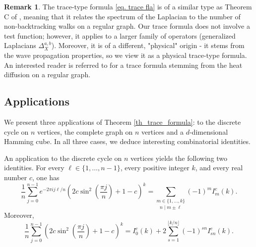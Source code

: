 \documentclass[reqno,10pt]{amsart}
\theoremstyle{definition}
\newtheorem{remark}[theorem]{Remark}
\numberwithin{equation}{section}
\begin{document}


\begin{remark}
 The trace-type formula \eqref{eq. trace fla} is of a similar type as Theorem C of \cite{GLL26}, meaning that it relates the spectrum of the Laplacian to the number of non-backtracking walks on a regular graph. Our trace formula does not involve a test function; however, it applies to a larger family of operators (generalized Laplacians $\Delta_X^{a,b}$). Moreover, it is of a different, "physical" origin - it stems from the wave propagation properties, so we view it as a physical trace-type formula. An interested reader is referred to \cite{CHJSV} for a trace formula stemming from the heat diffusion on a regular graph.   
\end{remark}

\subsection{Applications}

We present three applications of Theorem \ref{th_trace_formula}: to the discrete cycle on $n$ vertices, the complete graph on $n$ vertices and a $d$-dimensional Hamming cube. In all three cases, we deduce interesting combinatorial identities.

An application to the discrete cycle on $n$ vertices yields the following two identities.
For every $\ell\in\{1,\ldots,n-1\}$, every positive integer $k$, and every real number $c$, one has
\begin{equation}\label{bmCn_single_sum l}
    \frac{1}{n}\sum_{j=0}^{n-1}
e^{-2\pi i j\ell/n}
\left(
2c\sin^2\!\left(\frac{\pi j}{n}\right)+1-c
\right)^k  =
 \underset{n\mid m\pm \ell}{\sum_{m\in\{1,\ldots,k\}}} (-1)^m
I_m^{c}(k).
\end{equation}
Moreover,
\begin{equation}\label{eq:Cn_single_sum 0}
\frac{1}{n}\sum_{j=0}^{n-1}
\left(
2c\sin^2\!\left(\frac{\pi j}{n}\right)+1-c
\right)^k
=
I_0^{c}(k)
+
2\sum_{s=1}^{\lfloor k/n\rfloor}
(-1)^{s n}
I_{s n}^{c}(k).
\end{equation}
\end{document}
